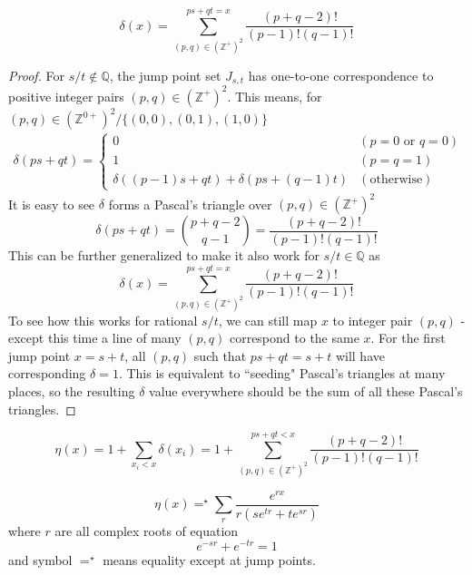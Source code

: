 \documentclass[]{article}
\begin{document}
\vspace{1cm}
\begin{lemma}
	\[
	\delta(x) = \sum_{(p,q)\in(\mathbb{Z}^+)^2}^{ps+qt = x} \frac{(p+q-2)!}{(p-1)!(q-1)!}
	\]
\end{lemma}
\begin{proof}
	For $s/t\notin\mathbb{Q}$, the jump point set $J_{s,t}$ has one-to-one correspondence to positive integer pairs $(p,q)\in(\mathbb{Z}^+)^2$. This means, for $(p,q)\in(\mathbb{Z}^{0+})^2 / \{(0,0), (0,1), (1,0)\}$
	\begin{align*}
		\delta(ps+qt) = \begin{cases}
			0 & (p= 0 \text{ or } q = 0) \\
			1 & (p = q = 1) \\
			\delta((p-1)s+qt) + \delta(ps+(q-1)t) & (\text{otherwise})
		\end{cases}
	\end{align*}
	It is easy to see $\delta$ forms a Pascal's triangle over $(p,q)\in(\mathbb{Z}^+)^2$
	\[
	\delta(ps+qt) = \binom{p+q-2}{q-1} = \frac{(p+q-2)!}{(p-1)!(q-1)!}
	\]
	This can be further generalized to make it also work for $s/t\in\mathbb{Q}$ as
	\[
	\delta(x) = \sum_{(p,q)\in(\mathbb{Z}^+)^2}^{ps+qt = x} \frac{(p+q-2)!}{(p-1)!(q-1)!}
	\]
	To see how this works for rational $s/t$, we can still map $x$ to integer pair $(p, q)$ - except this time a line of many $(p, q)$ correspond to the same $x$. For the first jump point $x = s + t$, all $(p, q)$ such that $ps + qt = s + t$ will have corresponding $\delta = 1$. This is equivalent to ``seeding" Pascal's triangles at many places, so the resulting $\delta$ value everywhere should be the sum of all these Pascal's triangles.
	
\end{proof}


\vspace{1cm}
\begin{lemma}
	\[
	\eta(x) = 1 + \sum_{x_i < x} \delta(x_i) = 1 + \sum_{(p,q)\in(\mathbb{Z}^+)^2}^{ps+qt < x} \frac{(p+q-2)!}{(p-1)!(q-1)!}
	\]
\end{lemma}

\vspace{1cm}
\begin{lemma}
	\[
	\eta(x) =^{\star} \sum_r \frac{e^{rx}}{r(s e^{tr} + t e^{sr})}
	\]
	where $r$ are all complex roots of equation
	\[
	e^{-sr} + e^{-tr} = 1
	\]
	and symbol $=^{\star}$ means equality except at jump points.
\end{lemma}
\end{document}
